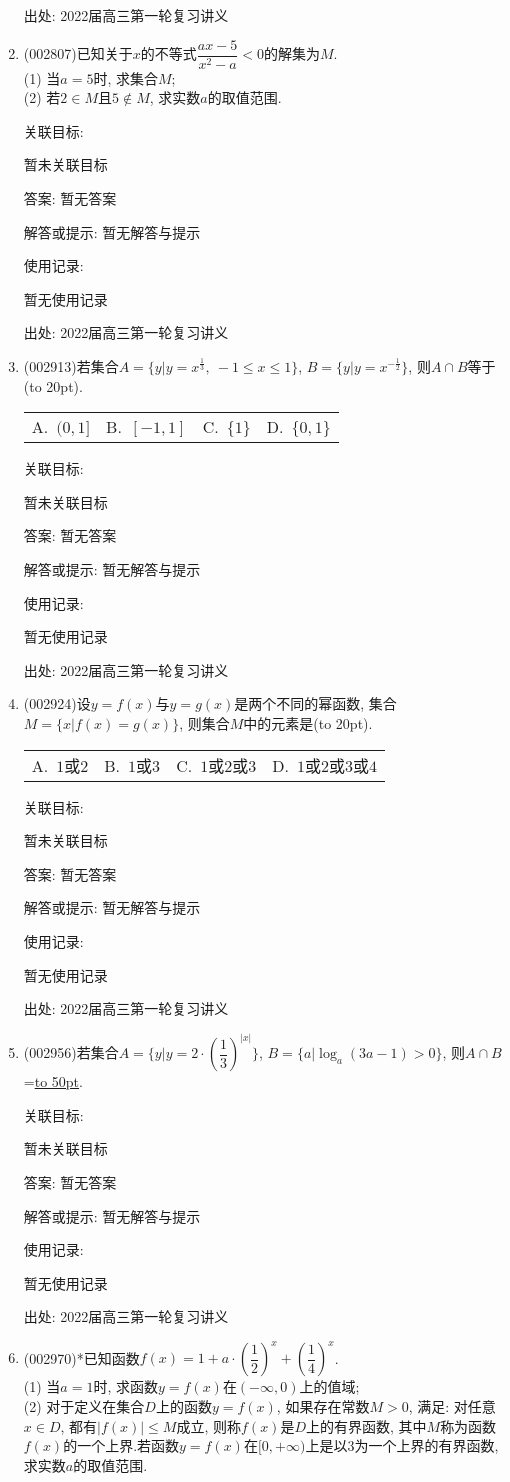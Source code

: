 \documentclass[10pt,a4paper]{article}
\newcommand{\blank}[1]{\underline{\hbox to #1pt{}}}
\newcommand{\bracket}[1]{(\hbox to #1pt{})}
\newcommand{\fourch}[4]{\par\begin{tabular}{p{.23\textwidth}p{.23\textwidth}p{.23\textwidth}p{.23\textwidth}}
A.~#1 &B.~#2& C.~#3& D.~#4
\end{tabular}}
\begin{document}
\begin{enumerate}[1.]
出处: 2022届高三第一轮复习讲义
\item { (002807)}已知关于$x$的不等式$\dfrac{ax-5}{x^2-a}<0$的解集为$M$.\\
(1) 当$a=5$时, 求集合$M$;\\
(2) 若$2\in M$且$5\notin M$, 求实数$a$的取值范围.


关联目标:

暂未关联目标

答案: 暂无答案

解答或提示: 暂无解答与提示

使用记录:

暂无使用记录


出处: 2022届高三第一轮复习讲义
\item { (002913)}若集合$A=\{y|y={x^{\frac 13}}, \ -1\le x\le 1\}$, $B=\{y|y={x^{-\frac 12}}\}$, 则$A\cap B$等于\bracket{20}.
\fourch{$(0,1]$}{$[-1,1]$}{$\{1\}$}{$\{0,1\}$}


关联目标:

暂未关联目标

答案: 暂无答案

解答或提示: 暂无解答与提示

使用记录:

暂无使用记录


出处: 2022届高三第一轮复习讲义
\item { (002924)}设$y=f(x)$与$y=g(x)$是两个不同的幂函数, 集合$M=\{x|f(x)=g(x)  \}$, 则集合$M$中的元素是\bracket{20}.
\fourch{$1$或$2$}{$1$或$3$}{$1$或$2$或$3$}{$1$或$2$或$3$或$4$}


关联目标:

暂未关联目标

答案: 暂无答案

解答或提示: 暂无解答与提示

使用记录:

暂无使用记录


出处: 2022届高三第一轮复习讲义
\item { (002956)}若集合$A=\{y|y=2\cdot (\dfrac 13)^{|x|}\}$, $B=\{ a|\log_a(3a-1)>0\}$, 则$A\cap B$=\blank{50}.


关联目标:

暂未关联目标

答案: 暂无答案

解答或提示: 暂无解答与提示

使用记录:

暂无使用记录


出处: 2022届高三第一轮复习讲义
\item { (002970)}*已知函数$f(x)=1+a\cdot (\dfrac 12)^x+(\dfrac 14)^x$.\\
(1) 当$a=1$时, 求函数$y=f(x)$在$(-\infty,0)$上的值域;\\
(2) 对于定义在集合$D$上的函数$y=f(x)$, 如果存在常数$M>0$, 满足: 对任意$x\in D$, 都有$|f(x)|\le M$成立, 则称$f(x)$是$D$上的有界函数, 其中$M$称为函数$f(x)$的一个上界.若函数$y=f(x)$在$[0,+\infty)$上是以$3$为一个上界的有界函数, 求实数$a$的取值范围.



\end{enumerate}
\end{document}
